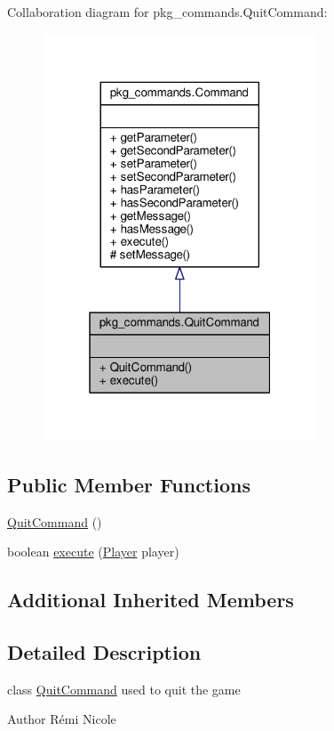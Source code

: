 Collaboration diagram for pkg\-\_\-commands.\-Quit\-Command\-:
\nopagebreak
\begin{figure}[H]
\begin{center}
\leavevmode
\includegraphics[width=232pt]{classpkg__commands_1_1QuitCommand__coll__graph}
\end{center}
\end{figure}
\subsection*{Public Member Functions}
\begin{DoxyCompactItemize}
\item 
\hyperlink{classpkg__commands_1_1QuitCommand_a92a35342caaa08998e70242e3e9997ae}{Quit\-Command} ()
\item 
boolean \hyperlink{classpkg__commands_1_1QuitCommand_abdba7a2abe3df12571396448d6b9e8a6}{execute} (\hyperlink{classpkg__world_1_1Player}{Player} player)
\end{DoxyCompactItemize}
\subsection*{Additional Inherited Members}


\subsection{Detailed Description}
class \hyperlink{classpkg__commands_1_1QuitCommand}{Quit\-Command} used to quit the game \begin{DoxyAuthor}{Author}
Rémi Nicole 
\end{DoxyAuthor}



